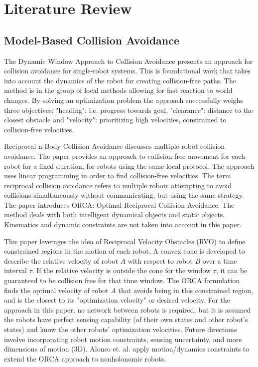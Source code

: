 \documentclass[conference]{IEEEtran}
\begin{document}
\section{Literature Review}

\subsection{Model-Based Collision Avoidance}
The Dynamic Window Approach to Collision Avoidance \cite{fox1997dynamic} presents an approach for collision avoidance for single-robot systems. This is foundational work that takes into account the dynamics of the robot for creating collision-free paths. The method is in the group of local methods allowing for fast reaction to world changes. By solving an optimization problem the approach successfully weighs three objectives: "heading": i.e. progress towards goal, "clearance": distance to the closest obstacle and "velocity": prioritizing high velocities, constrained to collision-free velocities. 

Reciprocal n-Body Collision Avoidance \cite{berg2011reciprocal} discusses multiple-robot collision avoidance. The paper provides an approach to collision-free movement for each robot for a fixed duration, for robots using the same local protocol. The approach uses linear programming in order to find collision-free velocities. The term reciprocal collision avoidance refers to multiple robots attempting to avoid collisions simultaneously without communicating, but using the same strategy. 
The paper introduces ORCA: Optimal Reciprocal Collision Avoidance. The method deals with both intelligent dynamical objects and static objects. Kinematics and dynamic constraints are not taken into account in this paper.

This paper leverages the idea of Reciprocal Velocity Obstacles (RVO) to define constrained regions in the motion of each robot. A convex cone is developed to describe the relative velocity of robot $A$ with respect to robot $B$ over a time interval $\tau$. If the relative velocity is outside the cone for the window $\tau$, it can be guaranteed to be collision free for that time window. The ORCA formulation finds the optimal velocity of robot $A$ that avoids being in this constrained region, and is the closest to its "optimization velocity" or desired velocity. For the approach in this paper, no network between robots is required, but it is assumed the robots have perfect sensing capability (of their own states and other robot's states) and know the other robots' optimization velocities. Future directions involve incorporating robot motion constraints, sensing uncertainty, and more dimensions of motion (3D). Alonso et. al. \cite{alonso2013optimal} apply motion/dynamics constraints to extend the ORCA approach to nonholonomic robots.
\end{document}
